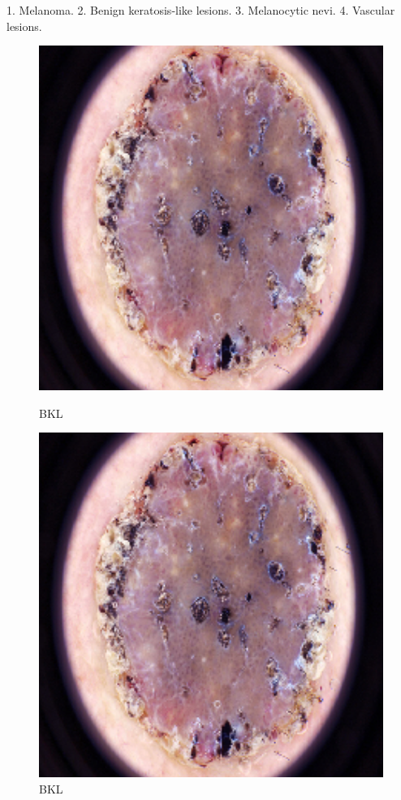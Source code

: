 1. Melanoma. 
2. Benign keratosis-like lesions.
3. Melanocytic nevi. 
4. Vascular lesions.

\begin{figure}
   \centering
   \begin{minipage}[b] {0.32\textwidth}
       \includegraphics[width=1\textwidth]{Images/bkl.png}
       \caption{BKL}
   \end{minipage} %

   \begin{minipage}[b] {0.32\textwidth}
        \includegraphics[width=1\textwidth]{Images/bkl.png}
        \caption{BKL}
    \end{minipage} %


\end{figure}
